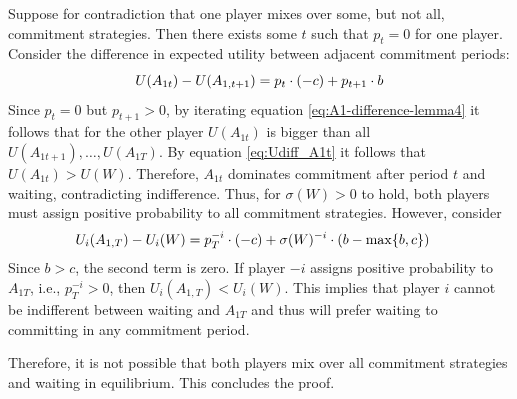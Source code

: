 \documentclass[../paper.tex]{subfiles}
\begin{document}
Suppose for contradiction that one player mixes over some, but not all, commitment strategies. Then there exists some $t$ such that $p_t = 0$ for one player. Consider the difference in expected utility between adjacent commitment periods:
\begin{equation}
    U(A_{1t})-U(A_{1,t+1}) = p_t \cdot (-c) + p_{t+1} \cdot b \label{eq:A1-difference-lemma4}
\end{equation}
Since $p_t = 0$ but $p_{t+1} > 0$, by iterating equation \ref{eq:A1-difference-lemma4} it follows that for the other player $U(A_{1t})$ is bigger than all $U(A_{1t+1}),\dots,U(A_{1T})$. By equation \ref{eq:Udiff_A1t} it follows that $U(A_{1t})>U(W)$. Therefore, $A_{1t}$ dominates commitment after period $t$ and waiting, contradicting indifference. Thus, for $\sigma(W) > 0$ to hold, both players must assign positive probability to all commitment strategies.
However, consider 
\begin{align*}
    &U_i(A_{1, T}) - U_i(W) = p_{T}^{-i} \cdot (- c) + \sigma(W)^{-i} \cdot (b-\max\{b,c\})
\end{align*}
Since $b > c$, the second term is zero. If player $-i$ assigns positive probability to $A_{1T}$, i.e., $p_T^{-i} > 0$, then $U_i(A_{1,T}) < U_i(W)$. This implies that player $i$ cannot be indifferent between waiting and $A_{1T}$ and thus will prefer waiting to committing in any commitment period.

Therefore, it is not possible that both players mix over all commitment strategies and waiting in equilibrium. This concludes the proof.
\end{document}
